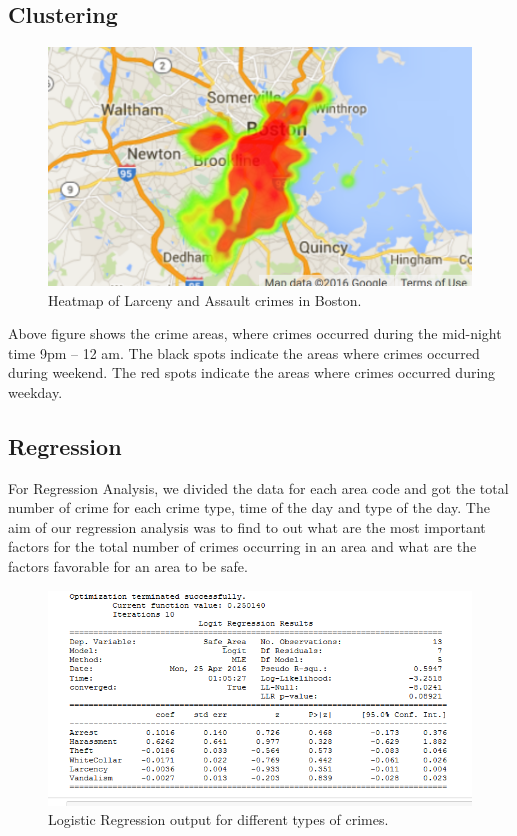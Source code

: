 \documentclass[journal, a4paper]{IEEEtran}
\begin{document}
\subsection{Clustering}
    \begin{figure}[!hbt]
        \begin{center}
        \includegraphics[width=\columnwidth]{boston-heatmap.png}
        \caption{Heatmap of Larceny and Assault crimes in Boston.}
        \label{fig:tf_plot}
        \end{center}
    \end{figure}

Above figure shows the crime areas, where crimes occurred during the mid-night time 9pm – 12 am.  The black spots indicate the areas where crimes occurred during weekend. The red spots indicate the areas where crimes occurred during weekday.



\subsection{Regression}
For Regression Analysis, we divided the data for each area code and got the total number of crime for each crime type, time of the day and type of the day. The aim of our regression analysis was to find to out what are the most important factors for the total number of crimes occurring in an area and what are the factors favorable for an area to be safe.

    \begin{figure}[!hbt]
        \begin{center}
        \includegraphics[width=\columnwidth]{logistic-reg-boston.png}
        \caption{Logistic Regression output for different types of crimes.}
        \label{fig:tf_plot}
        \end{center}
    \end{figure}
\end{document}
